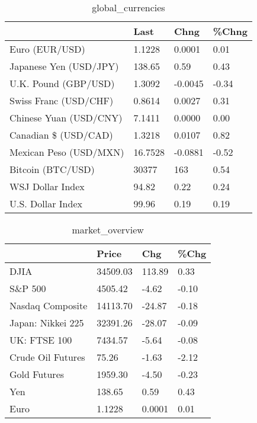 \documentclass{article}%
\begin{document}
%


\begin{table}[htbp]%
\caption{global\_currencies}%
\centering%
\begin{adjustbox}{width=1\textwidth}%
\begin{tabular}{llll}
\toprule
                       &    Last &    Chng & \%Chng \\
\midrule
        Euro (EUR/USD) &  1.1228 &  0.0001 &  0.01 \\
Japanese Yen (USD/JPY) &  138.65 &    0.59 &  0.43 \\
  U.K. Pound (GBP/USD) &  1.3092 & -0.0045 & -0.34 \\
 Swiss Franc (USD/CHF) &  0.8614 &  0.0027 &  0.31 \\
Chinese Yuan (USD/CNY) &  7.1411 &  0.0000 &  0.00 \\
  Canadian \$ (USD/CAD) &  1.3218 &  0.0107 &  0.82 \\
Mexican Peso (USD/MXN) & 16.7528 & -0.0881 & -0.52 \\
     Bitcoin (BTC/USD) &   30377 &     163 &  0.54 \\
      WSJ Dollar Index &   94.82 &    0.22 &  0.24 \\
     U.S. Dollar Index &   99.96 &    0.19 &  0.19 \\
\bottomrule
\end{tabular}
%
\end{adjustbox}%
\end{table}

%


\begin{table}[htbp]%
\caption{market\_overview}%
\centering%
\begin{adjustbox}{width=1\textwidth}%
\begin{tabular}{llll}
\toprule
                  &    Price &    Chg &  \%Chg \\
\midrule
             DJIA & 34509.03 & 113.89 &  0.33 \\
          S\&P 500 &  4505.42 &  -4.62 & -0.10 \\
 Nasdaq Composite & 14113.70 & -24.87 & -0.18 \\
Japan: Nikkei 225 & 32391.26 & -28.07 & -0.09 \\
     UK: FTSE 100 &  7434.57 &  -5.64 & -0.08 \\
Crude Oil Futures &    75.26 &  -1.63 & -2.12 \\
     Gold Futures &  1959.30 &  -4.50 & -0.23 \\
              Yen &   138.65 &   0.59 &  0.43 \\
             Euro &   1.1228 & 0.0001 &  0.01 \\
\bottomrule
\end{tabular}
%
\end{adjustbox}%
\end{table}

%
\end{document}
